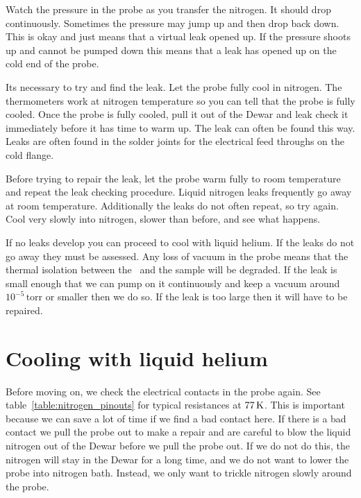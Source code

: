 Watch the pressure in the probe as you transfer the nitrogen. 
It should drop continuously.
Sometimes the pressure may jump up and then drop back down. This is okay and
just means that a virtual leak opened up. If the pressure shoots up and 
cannot be pumped down this means that a leak has opened up on the cold end
of the probe. 

Its necessary to try and find the leak. Let the probe fully cool in nitrogen. 
The thermometers work at nitrogen temperature
so you can tell that the probe is fully cooled. Once the probe is fully cooled,
pull it out of the Dewar and leak check it immediately before it has time to 
warm up.
The leak can often be found this way.
Leaks are often found in the solder joints for the electrical 
feed throughs on the cold flange.

Before trying to repair the leak, let the probe warm fully to room temperature
and repeat the leak checking procedure. Liquid nitrogen leaks frequently
go away at room temperature. Additionally the leaks 
do not often repeat, so try
again.  Cool very slowly into nitrogen, slower than before, 
and see what happens.

If no leaks develop you can proceed to cool with liquid helium. If the leaks
do not go away they must be assessed. Any loss of vacuum in the probe means
that the thermal isolation between the \squid\ and the sample will be 
degraded.
If the leak is small enough that we can pump on it continuously and keep 
a 
vacuum around $10^{-5}\,\mathrm{torr}$ or smaller
then we do so. If the leak is too large then it will
have to be repaired. 

\section{Cooling with liquid helium}

Before moving on, we check the 
electrical contacts in the probe again.
See table~\ref{table:nitrogen_pinouts} for typical resistances at
$77\,\kelvin$.
 This is important
because we can save a lot of time if we find a bad contact here. 
If there is a bad contact we pull the probe out to make
a repair and are careful to blow the liquid nitrogen out of the Dewar before
we pull the probe out. If we do not do this, the nitrogen will stay
in the Dewar for a long time, and we do not want to lower the probe into
nitrogen bath. Instead, we
only want to trickle nitrogen slowly around the probe.

